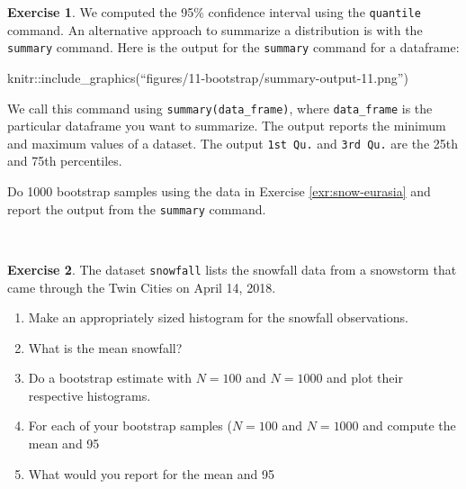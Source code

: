 \documentclass[
]{book}
\theoremstyle{definition}
\theoremstyle{definition}
\theoremstyle{definition}
\newtheorem{exercise}{Exercise}[chapter]
\theoremstyle{remark}
\begin{document}
\begin{exercise}
\protect\hypertarget{exr:unnamed-chunk-199}{}{\label{exr:unnamed-chunk-199} }We computed the 95\% confidence interval using the \texttt{quantile} command. An alternative approach to summarize a distribution is with the \texttt{summary} command. Here is the output for the \texttt{summary} command for a dataframe:

knitr::include\_graphics(``figures/11-bootstrap/summary-output-11.png'')

We call this command using \texttt{summary(data\_frame)}, where \texttt{data\_frame} is the particular dataframe you want to summarize. The output reports the minimum and maximum values of a dataset. The output \texttt{1st\ Qu.} and \texttt{3rd\ Qu.} are the 25th and 75th percentiles.

Do 1000 bootstrap samples using the data in Exercise \ref{exr:snow-eurasia} and report the output from the \texttt{summary} command.
\end{exercise}

~

\begin{exercise}
\protect\hypertarget{exr:unnamed-chunk-200}{}{\label{exr:unnamed-chunk-200} }The dataset \texttt{snowfall} lists the snowfall data from a snowstorm that came through the Twin Cities on April 14, 2018.

\begin{enumerate}[label=\alph*.]
\item Make an appropriately sized histogram for the snowfall observations.
\item What is the mean snowfall?
\item Do a bootstrap estimate with $N=100$ and $N=1000$ and plot their respective histograms.
\item For each of your bootstrap samples ($N=100$ and $N=1000$ and compute the mean and 95%
\item What would you report for the mean and 95%
\end{enumerate}
\end{exercise}
\end{document}
